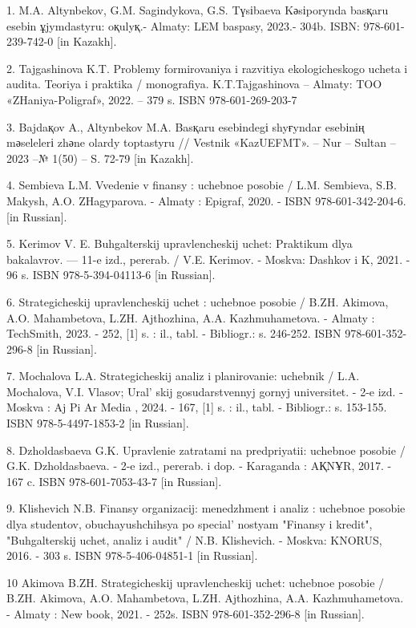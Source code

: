 \begin{references}

1. M.A. Altynbekov, G.M. Sagindykova, G.S. Tүsіbaeva Kәsіporynda basқaru
esebіn ұjymdastyru: oқulyқ.- Almaty: LEM baspasy, 2023.- 304b. ISBN:
978-601-239-742-0 {[}in Kazakh{]}.

2. Tajgashinova K.T. Problemy formirovaniya i razvitiya ekologicheskogo
ucheta i audita. Teoriya i praktika / monografiya. K.T.Tajgashinova --
Almaty: TOO «ZHaniya-Poligraf», 2022. -- 379 s. ISBN 978-601-269-203-7

3. Bajdaқov A., Altynbekov M.A. Basқaru esebіndegі shyғyndar esebіnің
mәselelerі zhәne olardy toptastyru // Vestnik «KazUEFMT». -- Nur --
Sultan -- 2023 --№ 1(50) -- S. 72-79 {[}in Kazakh{]}.

4. Sembieva L.M. Vvedenie v finansy : uchebnoe posobie / L.M. Sembieva,
S.B. Makysh, A.O. ZHagyparova. - Almaty : Epigraf, 2020. - ISBN
978-601-342-204-6. {[}in Russian{]}.

5. Kerimov V. E. Buhgalterskij upravlencheskij uchet: Praktikum dlya
bakalavrov. --- 11-e izd., pererab. / V.E. Kerimov. - Moskva: Dashkov i
K, 2021. - 96 s. ISBN 978-5-394-04113-6 {[}in Russian{]}.

6. Strategicheskij upravlencheskij uchet : uchebnoe posobie / B.ZH.
Akimova, A.O. Mahambetova, L.ZH. Ajthozhina, A.A. Kazhmuhametova. -
Almaty : TechSmith, 2023. - 252, {[}1{]} s. : il., tabl. - Bibliogr.: s.
246-252. ISBN 978-601-352-296-8 {[}in Russian{]}.

7. Mochalova L.A. Strategicheskij analiz i planirovanie: uchebnik / L.A.
Mochalova, V.I. Vlasov; Ural' skij gosudarstvennyj gornyj
universitet. - 2-e izd. - Moskva : Aj Pi Ar Media , 2024. - 167, {[}1{]}
s. : il., tabl. - Bibliogr.: s. 153-155. ISBN 978-5-4497-1853-2 {[}in
Russian{]}.

8. Dzholdasbaeva G.K. Upravlenie zatratami na predpriyatii: uchebnoe
posobie / G.K. Dzholdasbaeva. - 2-e izd., pererab. i dop. - Karaganda :
AҚNҰR, 2017. - 167 c. ISBN 978-601-7053-43-7 {[}in Russian{]}.

9. Klishevich N.B. Finansy organizacij: menedzhment i analiz : uchebnoe
posobie dlya studentov, \linebreak obuchayushchihsya po
special' nostyam "Finansy i kredit", "Buhgalterskij
uchet, analiz i audit" / N.B. Klishevich. - Moskva: KNORUS, 2016. - 303
s. ISBN 978-5-406-04851-1 {[}in Russian{]}.

10 Akimova B.ZH. Strategicheskij upravlencheskij uchet: uchebnoe posobie
/ B.ZH. Akimova, A.O. Mahambetova, L.ZH. Ajthozhina, A.A.
Kazhmuhametova. - Almaty : New book, 2021. - 252s. ISBN
978-601-352-296-8 {[}in Russian{]}.


\end{references}

